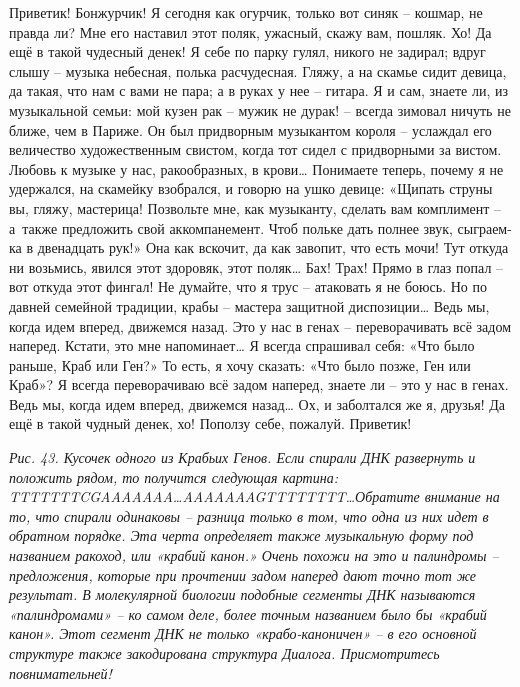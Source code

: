 \documentclass[../main.tex]{subfiles}
\begin{document}
\begin{dialogue}
 Приветик! Бонжурчик! Я сегодня как огурчик, только вот синяк \--- кошмар, не правда ли? Мне его наставил этот поляк, ужасный, скажу вам, пошляк. Хо! Да ещё в такой чудесный денек! Я себе по парку гулял, никого не задирал; вдруг слышу \--- музыка небесная, полька расчудесная. Гляжу, а на скамье сидит девица, да такая, что нам с вами не пара; а в руках у нее \--- гитара. Я и сам, знаете ли, из музыкальной семьи: мой кузен рак \--- мужик не дурак! \--- всегда зимовал ничуть не ближе, чем в Париже. Он был придворным музыкантом короля \--- услаждал его величество художественным свистом, когда тот сидел с придворными за вистом. Любовь к музыке у нас, ракообразных, в крови\ldots{} Понимаете теперь, почему я не удержался, на скамейку взобрался, и говорю на ушко девице: «Щипать струны вы, гляжу, мастерица! Позвольте мне, как музыканту, сделать вам комплимент \--- а~также предложить свой аккомпанемент. Чтоб польке дать полнее звук, сыграем-ка в двенадцать рук!» Она как вскочит, да как завопит, что есть мочи! Тут откуда ни возьмись, явился этот здоровяк, этот поляк\ldots{} Бах! Трах! Прямо в глаз попал \--- вот откуда этот фингал! Не думайте, что я трус \--- атаковать я не боюсь. Но по давней семейной традиции, крабы \--- мастера защитной диспозиции\ldots{} Ведь мы, когда идем вперед, движемся назад. Это у нас в генах \--- переворачивать всё задом наперед. Кстати, это мне напоминает\ldots{} Я всегда спрашивал себя: «Что было раньше, Краб или Ген?» То есть, я хочу сказать: «Что было позже, Ген или Краб»? Я всегда переворачиваю всё задом наперед, знаете ли \--- это у нас в генах. Ведь мы, когда идем вперед, движемся назад\ldots{} Ох, и заболтался же я, друзья! Да ещё в такой чудный денек, хо! Поползу себе, пожалуй. Приветик!


\emph{Рис. 43. Кусочек одного из Крабьих Генов. Если спирали ДНК развернуть и положить рядом, то получится следующая картина: TTTTTTTCGAAAAAAA\ldots{}AAAAAAAGTTTTTTTT\ldots Обратите внимание на то, что спирали одинаковы \--- разница только в том, что одна из них идет в обратном порядке. Эта черта определяет также музыкальную форму под названием ракоход, или «крабий канон.» Очень похожи на это и палиндромы \--- предложения, которые при прочтении задом наперед дают точно тот же результат. В молекулярной биологии подобные сегменты ДНК называются «палиндромами» \--- ко самом деле, более точным названием было бы «крабий канон». Этот сегмент ДНК не только «крабо-каноничен» \--- в его основной структуре также закодирована структура Диалога. Присмотритесь повнимательней!}


\end{dialogue}
\end{document}
